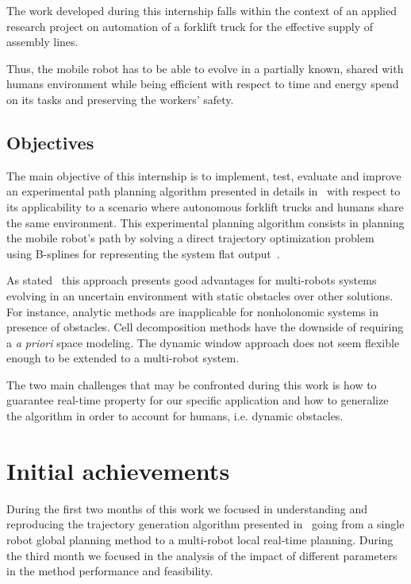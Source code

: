 The work developed during this internship falls within the context of an applied research project on automation of a forklift truck for the effective supply of assembly lines.

Thus, the mobile robot has to be able to evolve in a partially known, shared with humans environment while being efficient with respect to time and energy spend on its tasks and preserving the workers' safety.

\subsection{Objectives}

The main objective of this internship is to implement, test, evaluate and improve an experimental path planning algorithm presented in details in~\cite{Defoort2007a} with respect to its applicability to a scenario where autonomous forklift trucks and humans share the same environment. This experimental planning algorithm consists in planning the mobile robot's path by solving a direct trajectory optimization problem~\cite{betts1998survey} using B-splines for representing the system flat output~\cite{milam2003real}. 

As stated~\cite{Defoort2007a} this approach presents good advantages for multi-robots systems evolving in an uncertain environment with static obstacles over other solutions. For instance, analytic methods are inapplicable for nonholonomic systems in presence of obstacles. Cell decomposition methods have the downside of requiring a \textit{a priori} space modeling. The dynamic window approach does not seem flexible enough to be extended to a multi-robot system.

The two main challenges that may be confronted during this work is how to guarantee real-time property for our specific application and how to generalize the algorithm in order to account for humans, i.e. dynamic obstacles.

\clearpage
\section{Initial achievements}
\label{sec:etatdelart}


During the first two months of this work we focused in understanding and reproducing the trajectory generation algorithm presented in~\cite{Defoort2007a} going from a single robot global planning method to a multi-robot local real-time planning. During the third month we focused in the analysis of the impact of different parameters in the method performance and feasibility.

